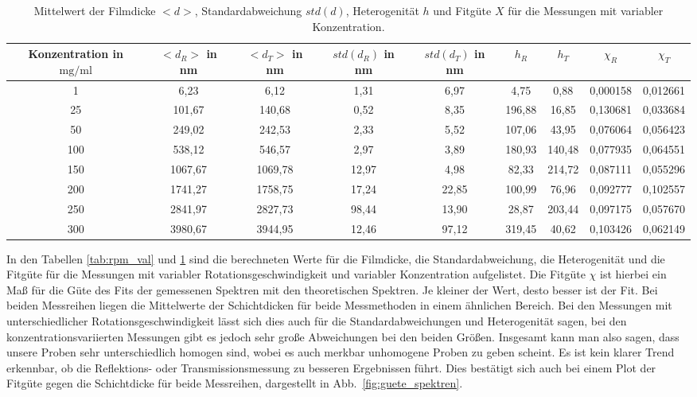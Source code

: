 \begin{table}[h!]
    \centering
    \begin{tabular}{|c|c|c|c|c|c|c|c|c|}
        \hline
        \makecell{Konzentration\\in $\si{\milli\gram\per\milli\litre}$} & \makecell{$<d_R>$\\in nm} & \makecell{$<d_T>$\\in nm} & \makecell{$std(d_R)$\\in nm} & \makecell{$std(d_T)$\\in nm}& $h_R$ & $h_T$ & $\chi_R$ & $\chi_T$ \\ [0.5ex]
        \hline \hline
        1 & 6,23 & 6,12 & 1,31 & 6,97 & 4,75 & 0,88 & 0,000158 & 0,012661 \\
        25 & 101,67 & 140,68 & 0,52 & 8,35 & 196,88 & 16,85 & 0,130681 & 0,033684 \\
        50 & 249,02 & 242,53 & 2,33 & 5,52 & 107,06 & 43,95 & 0,076064 & 0,056423 \\
        100 & 538,12 & 546,57 & 2,97 & 3,89 & 180,93 & 140,48 & 0,077935 & 0,064551 \\
        150 & 1067,67 & 1069,78 & 12,97 & 4,98 & 82,33 & 214,72 & 0,087111 & 0,055296 \\
        200 & 1741,27 & 1758,75 & 17,24 & 22,85 & 100,99 & 76,96 & 0,092777 & 0,102557 \\
        250 & 2841,97 & 2827,73 & 98,44 & 13,90 & 28,87 & 203,44 & 0,097175 & 0,057670 \\
        300 & 3980,67 & 3944,95 & 12,46 & 97,12 & 319,45 & 40,62 & 0,103426 & 0,062149 \\[1ex]
       \hline
       \end{tabular}
       \caption{Mittelwert der Filmdicke $<d>$, Standardabweichung $std(d)$, Heterogenität $h$ und Fitgüte $X$ für die Messungen mit variabler Konzentration.}
       \label{tab:conc_val}
    \end{table}

In den Tabellen \ref{tab:rpm_val} und \ref{tab:conc_val} sind die berechneten Werte für die Filmdicke, die Standardabweichung, die Heterogenität und die Fitgüte für die Messungen mit variabler Rotationsgeschwindigkeit und variabler Konzentration aufgelistet. Die Fitgüte $\chi$ ist hierbei ein Maß für die Güte des Fits der gemessenen Spektren mit den theoretischen Spektren. Je kleiner der Wert, desto besser ist der Fit.
Bei beiden Messreihen liegen die Mittelwerte der Schichtdicken für beide Messmethoden in einem ähnlichen Bereich. Bei den Messungen mit unterschiedlicher Rotationsgeschwindigkeit lässt sich dies auch für die Standardabweichungen und Heterogenität sagen, bei den konzentrationsvariierten Messungen gibt es jedoch sehr große Abweichungen bei den beiden Größen. Insgesamt kann man also sagen, dass unsere Proben sehr unterschiedlich homogen sind, wobei es auch merkbar unhomogene Proben zu geben scheint.
Es ist kein klarer Trend erkennbar, ob die Reflektions- oder Transmissionsmessung zu besseren Ergebnissen führt. Dies bestätigt sich auch bei einem Plot der Fitgüte gegen die Schichtdicke für beide Messreihen, dargestellt in Abb.~\ref{fig:guete_spektren}.



